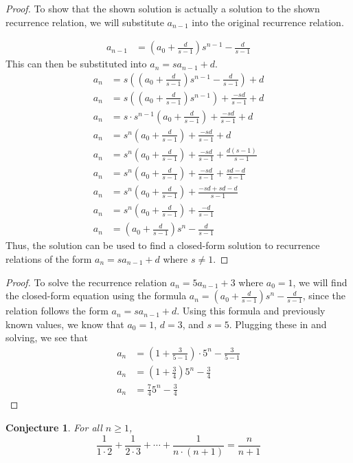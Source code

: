 \documentclass[11pt,titlepage]{article}		%
\theoremstyle{theorem}
\newtheorem{conjecture}[theorem]{Conjecture}
\begin{document}
\begin{proof}
To show that the shown solution is actually a solution to the shown recurrence relation, we will substitute $a_{n-1}$ into the original recurrence relation. 

\begin{align*}
a_{n-1} &= (a_0 + \frac{d}{s-1})s^{n-1}-\frac{d}{s-1}
\end{align*}
This can then be substituted into $a_n = sa_{n-1} + d$.
\begin{align*}
a_n &= s((a_0 + \frac{d}{s-1})s^{n-1}-\frac{d}{s-1}) + d\\
a_n &= s((a_0 + \frac{d}{s-1})s^{n-1}) + \frac{-sd}{s-1} + d\\
a_n &= s \cdot s^{n-1}(a_0 + \frac{d}{s-1}) + \frac{-sd}{s-1} + d\\
a_n &= s^n(a_0 + \frac{d}{s-1}) + \frac{-sd}{s-1} + d\\
a_n &= s^n(a_0 + \frac{d}{s-1}) + \frac{-sd}{s-1} + \frac{d(s-1)}{s-1}\\
a_n &= s^n(a_0 + \frac{d}{s-1}) + \frac{-sd}{s-1} + \frac{sd - d}{s-1}\\
a_n &= s^n(a_0 + \frac{d}{s-1}) + \frac{-sd + sd - d}{s-1}\\
a_n &= s^n(a_0 + \frac{d}{s-1}) + \frac{-d}{s-1}\\
a_n &= (a_0 + \frac{d}{s-1})s^n - \frac{d}{s-1} 
\end{align*}
Thus, the solution can be used to find a closed-form solution to recurrence relations of the form $a_n = s a_{n-1}+d$ where $s\ne 1$.
\end{proof}
\clearpage
\begin{proof}
To solve the recurrence relation $a_n = 5 a_{n-1} + 3$ where $a_0 = 1$, we will find the closed-form equation using the formula $a_n = \left(a_0 + \frac{d}{s-1}\right) s^n - \frac{d}{s-1}$, since the relation follows the form $a_n = s a_{n-1}+d$. Using this formula and previously known values, we know that $a_0 = 1$, $d =3$, and $s=5$. Plugging these in and solving, we see that
\begin{align*}
a_n &= (1 + \frac{3}{5-1})\cdot5^n - \frac{3}{5-1}\\
a_n &= ( 1 + \frac{3}{4}) 5^n - \frac{3}{4}\\
a_n &= \frac{7}{4}5^n - \frac{3}{4}
\end{align*}
\end{proof}

\clearpage

\begin{conjecture}
    For all $n\ge 1$,
    \[
        \frac{1}{1\cdot 2} + \frac{1}{2\cdot 3} + \cdots + \frac{1}{n\cdot(n+1)} = \frac{n}{n+1}
    \]
\end{conjecture}
\end{document}
